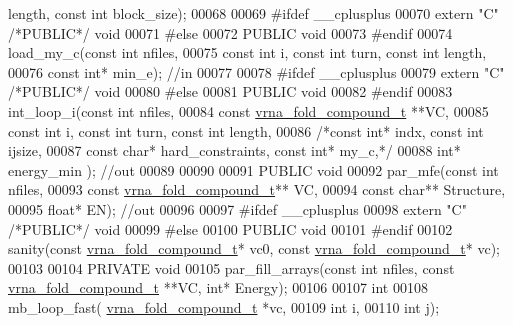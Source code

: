 \begin{DoxyCode}
       length, \textcolor{keyword}{const} \textcolor{keywordtype}{int} block\_size);
00068 
00069 \textcolor{preprocessor}{#ifdef \_\_cplusplus}
00070 \textcolor{keyword}{extern} \textcolor{stringliteral}{"C"} \textcolor{comment}{/*PUBLIC*/} \textcolor{keywordtype}{void}
00071 \textcolor{preprocessor}{#else}
00072 PUBLIC \textcolor{keywordtype}{void}
00073 \textcolor{preprocessor}{#endif}
00074 load\_my\_c(\textcolor{keyword}{const} \textcolor{keywordtype}{int} nfiles,
00075     \textcolor{keyword}{const} \textcolor{keywordtype}{int} i, \textcolor{keyword}{const} \textcolor{keywordtype}{int} turn, \textcolor{keyword}{const} \textcolor{keywordtype}{int} length,
00076     \textcolor{keyword}{const} \textcolor{keywordtype}{int}* min\_e); \textcolor{comment}{//in}
00077 
00078 \textcolor{preprocessor}{#ifdef \_\_cplusplus}
00079 \textcolor{keyword}{extern} \textcolor{stringliteral}{"C"} \textcolor{comment}{/*PUBLIC*/} \textcolor{keywordtype}{void}
00080 \textcolor{preprocessor}{#else}
00081 PUBLIC \textcolor{keywordtype}{void}
00082 \textcolor{preprocessor}{#endif}
00083 int\_loop\_i(\textcolor{keyword}{const} \textcolor{keywordtype}{int} nfiles,
00084      \textcolor{keyword}{const} \mbox{\hyperlink{group__fold__compound_structvrna__fc__s}{vrna\_fold\_compound\_t}} **VC,
00085      \textcolor{keyword}{const} \textcolor{keywordtype}{int} i, \textcolor{keyword}{const} \textcolor{keywordtype}{int} turn, \textcolor{keyword}{const} \textcolor{keywordtype}{int} length,
00086      \textcolor{comment}{/*const int* indx, const int ijsize,}
00087 \textcolor{comment}{     const char* hard\_constraints, const int* my\_c,*/}
00088      \textcolor{keywordtype}{int}* energy\_min ); \textcolor{comment}{//out}
00089 
00090 
00091 PUBLIC \textcolor{keywordtype}{void}
00092 par\_mfe(\textcolor{keyword}{const} \textcolor{keywordtype}{int} nfiles,
00093   \textcolor{keyword}{const} \mbox{\hyperlink{group__fold__compound_structvrna__fc__s}{vrna\_fold\_compound\_t}}** VC,
00094   \textcolor{keyword}{const} \textcolor{keywordtype}{char}** Structure,
00095   \textcolor{keywordtype}{float}* EN); \textcolor{comment}{//out}
00096 
00097 \textcolor{preprocessor}{#ifdef \_\_cplusplus}
00098 \textcolor{keyword}{extern} \textcolor{stringliteral}{"C"} \textcolor{comment}{/*PUBLIC*/} \textcolor{keywordtype}{void}
00099 \textcolor{preprocessor}{#else}
00100 PUBLIC \textcolor{keywordtype}{void}
00101 \textcolor{preprocessor}{#endif}
00102 sanity(\textcolor{keyword}{const} \mbox{\hyperlink{group__fold__compound_structvrna__fc__s}{vrna\_fold\_compound\_t}}* vc0, \textcolor{keyword}{const} 
      \mbox{\hyperlink{group__fold__compound_structvrna__fc__s}{vrna\_fold\_compound\_t}}* vc);
00103 
00104 PRIVATE \textcolor{keywordtype}{void}
00105 par\_fill\_arrays(\textcolor{keyword}{const} \textcolor{keywordtype}{int} nfiles, \textcolor{keyword}{const} \mbox{\hyperlink{group__fold__compound_structvrna__fc__s}{vrna\_fold\_compound\_t}} **VC, \textcolor{keywordtype}{int}* Energy);
00106 
00107 \textcolor{keywordtype}{int}
00108 mb\_loop\_fast( \mbox{\hyperlink{group__fold__compound_structvrna__fc__s}{vrna\_fold\_compound\_t}} *vc,
00109                 \textcolor{keywordtype}{int} i,
00110                 \textcolor{keywordtype}{int} j);
\end{DoxyCode}
